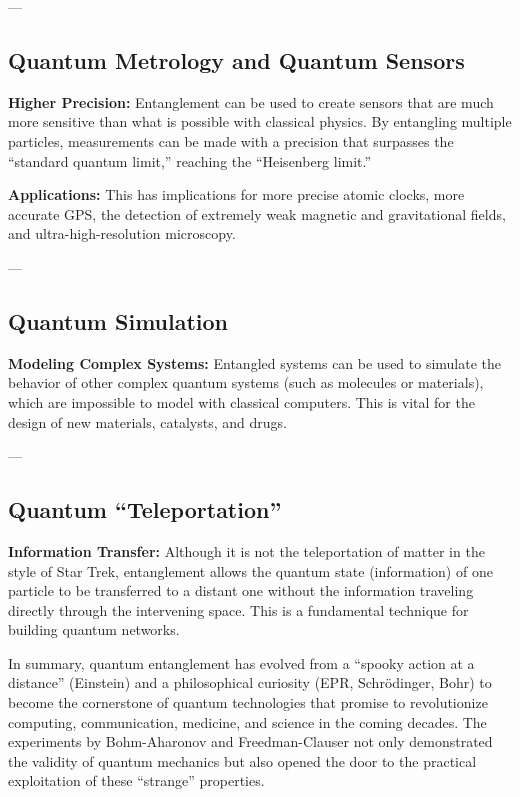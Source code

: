 ---
\subsection{Quantum Metrology and Quantum Sensors}

\textbf{Higher Precision:} Entanglement can be used to create sensors that are much more sensitive than what is possible with classical physics. By entangling multiple particles, 
measurements can be made with a precision that surpasses the ``standard quantum limit,'' reaching the ``Heisenberg limit.''

\textbf{Applications:} This has implications for more precise atomic clocks, more accurate GPS, the detection of extremely weak magnetic and gravitational fields, and ultra-high-resolution
microscopy.

---
\subsection{Quantum Simulation}

\textbf{Modeling Complex Systems:} Entangled systems can be used to simulate the behavior of other complex quantum systems (such as molecules or materials), which are impossible to model
with classical computers. This is vital for the design of new materials, catalysts, and drugs.

---
\subsection{Quantum ``Teleportation''}

\textbf{Information Transfer:} Although it is not the teleportation of matter in the style of Star Trek, entanglement allows the quantum state (information) of one particle to be transferred 
to a distant one without the information traveling directly through the intervening space. This is a fundamental technique for building quantum networks.

\par\vspace{\baselineskip}
In summary, quantum entanglement has evolved from a ``spooky action at a distance'' (Einstein) and a philosophical curiosity (EPR, Schrödinger, Bohr) to become the cornerstone of quantum technologies 
that promise to revolutionize computing, communication, medicine, and science in the coming decades. The experiments by Bohm-Aharonov and Freedman-Clauser not only demonstrated the validity of quantum
mechanics but also opened the door to the practical exploitation of these ``strange'' properties.
